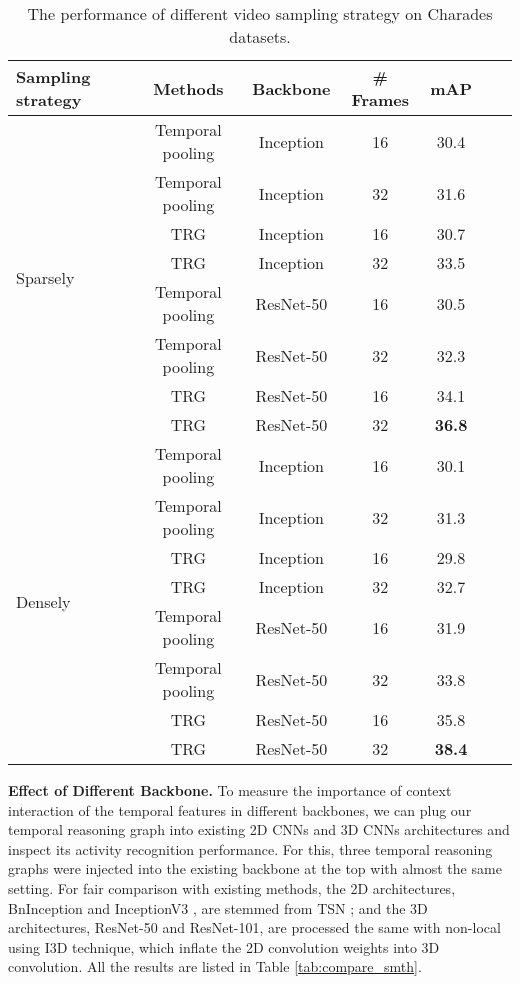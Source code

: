 \documentclass[conference,compsoc]{IEEEtran}
\begin{document}
    \begin{table}
\caption{The performance of different video sampling strategy on Charades datasets.}
        \begin{center}
        \begin{tabular}{lcccccc}
        \toprule
         Sampling strategy & Methods & Backbone & \# Frames & mAP\\
         \midrule
         \multirow{8}{*}{Sparsely} &  Temporal pooling & Inception & 16 & 30.4\\
         & Temporal pooling & Inception & 32 & 31.6\\
         & TRG & Inception & 16 & 30.7 \\
         & TRG & Inception & 32 & 33.5 \\
         & Temporal pooling & ResNet-50 & 16 & 30.5\\
         & Temporal pooling & ResNet-50 & 32 & 32.3\\
         & TRG & ResNet-50 & 16 & 34.1 \\
         & TRG & ResNet-50 & 32 & \textbf{36.8} \\\hline
         \multirow{8}{*}{Densely} &  Temporal pooling & Inception & 16 & 30.1\\
         & Temporal pooling & Inception & 32 & 31.3\\
         & TRG & Inception & 16 & 29.8 \\
         & TRG & Inception & 32 & 32.7 \\
         & Temporal pooling & ResNet-50 & 16 & 31.9\\
         & Temporal pooling & ResNet-50 & 32 & 33.8\\
         & TRG & ResNet-50 & 16 & 35.8 \\
         & TRG & ResNet-50 & 32 & \textbf{38.4} \\
         \bottomrule
        \end{tabular}
        \end{center}
        \vspace{-3mm}
        \label{tab:abla-sampling}
\end{table}
    
    
    \noindent\textbf{Effect of Different Backbone.}
    To measure the importance of context interaction of the temporal features in different backbones, we can plug our temporal reasoning graph into existing 2D CNNs and 3D CNNs architectures and inspect its activity recognition performance. For this, three temporal reasoning graphs were injected into the existing backbone at the top with almost the same setting. For fair comparison with existing methods, the 2D architectures, BnInception \cite{ioffe2015batch} and InceptionV3 \cite{szegedy2016rethinking}, are stemmed from TSN \cite{wang2016temporal}; and the 3D architectures, ResNet-50 \cite{he2016deep} and ResNet-101, are processed the same with non-local \cite{wang2018non} using I3D \cite{carreira2017quo} technique, which inflate the 2D convolution weights into 3D convolution. All the results are listed in Table \ref{tab:compare_smth}.  
    
\end{document}
